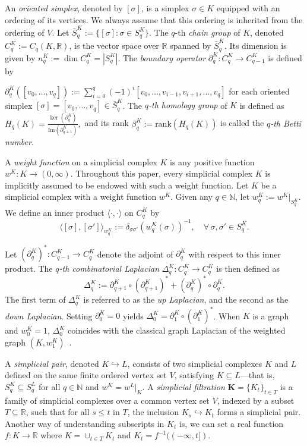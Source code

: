 \documentclass{article}
\newcommand{\R}{\mathbb{R}}
\newcommand{\N}{\mathbb{N}}
\begin{document}
An \emph{oriented simplex}, denoted by $[\sigma]$, is a simplex $\sigma \in K$ equipped with an ordering of its vertices. We always assume that this ordering is inherited from the ordering of $V$. Let $\bar{S}_q^K := \{[\sigma] : \sigma \in S_q^K\}$. The $q$-th \emph{chain group} of $K$, denoted $C_q^K := C_q(K, \mathbb{R})$, is the vector space over $\mathbb{R}$ spanned by $\bar{S}_q^K$. Its dimension is given by $n_q^K := \dim C_q^K = |S_q^K|$. The \emph{boundary operator} $\partial_q^K : C_q^K \to C_{q-1}^K$ is defined by

\(
\partial_q^K([v_0, \ldots, v_q]) := \sum_{i=0}^q (-1)^i [v_0, \ldots, v_{i-1}, v_{i+1}, \ldots, v_q]
\)
for each oriented simplex $[\sigma] = [v_0, \ldots, v_q] \in \bar{S}_q^K$.
The \emph{$q$-th homology group} of $K$ is defined as \(H_q(K) = \frac{\ker(\partial_q^K)}{\text{Im}(\partial_{q+1}^K)},\) and its rank $\beta_q^K := \text{rank}(H_q(K))$ is called the \emph{$q$-th Betti number}.

A \emph{weight function} on a simplicial complex $K$ is any positive function $w^K : K \to (0, \infty)$. Throughout this paper, every simplicial complex $K$ is implicitly assumed to be endowed with such a weight function.
Let $K$ be a simplicial complex with a weight function $w^K$. Given any $q \in \N$, let $w^K_q:=w^K|_{S^K_q}$. We define an inner product $\langle\cdot,\cdot\rangle$ on $C_q^K$ by
\[
\langle [\sigma], [\sigma'] \rangle_{w_q^K} := \delta_{\sigma \sigma'} \left(w_q^K(\sigma)\right)^{-1}, \quad \forall\, \sigma, \sigma' \in S_q^K.
\]

Let $\left(\partial_q^K\right)^* : C_{q-1}^K \to C_q^K$ denote the adjoint of $\partial_q^K$ with respect to this inner product. The \emph{$q$-th combinatorial Laplacian} $\Delta_q^K : C_q^K \to C_q^K$ is then defined as
\[
\Delta_q^K := \partial_{q+1}^K \circ \left(\partial_{q+1}^K\right)^* + \left(\partial_q^K\right)^* \circ \partial_q^K.
\]
The first term of $\Delta_q^K$ is referred to as the \emph{up Laplacian}, and the second as the \emph{down Laplacian}. Setting $\partial_0^K = 0$ yields $\Delta_0^K = \partial_1^K \circ \left(\partial_1^K\right)^*$. When $K$ is a graph and $w_0^K = 1$, $\Delta_0^K$ coincides with the classical graph Laplacian of the weighted graph $(K, w_1^K)$~\cite{Chung97}.

A \emph{simplicial pair}, denoted $K \hookrightarrow L$, consists of two simplicial complexes $K$ and $L$ defined on the same finite ordered vertex set $V$, satisfying $K \subseteq L$—that is, $S_q^K \subseteq S_q^L$ for all $q \in \mathbb{N}$ and $w^K = w^L|_K$. A \emph{simplicial filtration} $\mathbf{K} = \{K_t\}_{t \in T}$ is a family of simplicial complexes over a common vertex set $V$, indexed by a subset $T \subseteq \mathbb{R}$, such that for all $s \leq t$ in $T$, the inclusion $K_s \hookrightarrow K_t$ forms a simplicial pair. Another way of understanding subscripts in $K_t$ is, we can set a real function $f:K\rightarrow \R$ where $K=\cup_{t\in T}K_t$ and $K_t=f^{-1}((-\infty,t])$.
\end{document}
